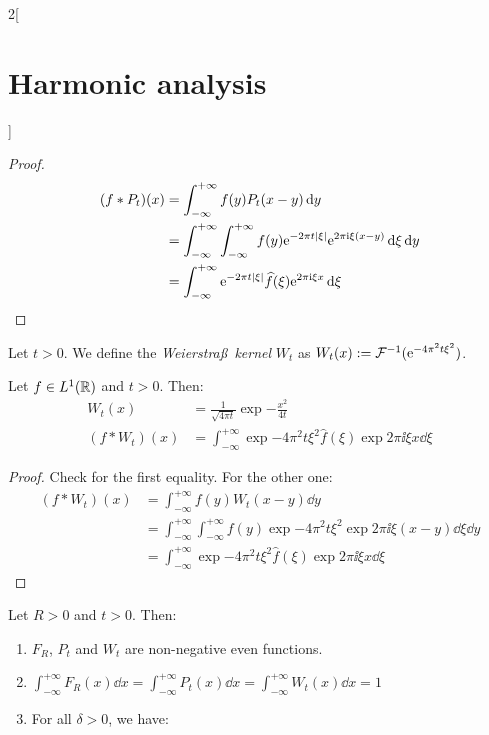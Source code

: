\documentclass[../../../main_math.tex]{subfiles}
\begin{document}
\begin{multicols}{2}[\section{Harmonic analysis}]
\begin{proof}
\begin{align*}
      (f*P_t)(x) & =\int_{-\infty}^{+\infty}f(y)P_t(x-y)\dd{y}                                                                      \\
                 & =\int_{-\infty}^{+\infty}\int_{-\infty}^{+\infty}f(y)\mathrm{e}^{-2\pi t\abs{\xi}}\mathrm{e}^{2\pi\mathrm{i} \xi (x-y)}\dd{\xi}\dd{y} \\
                 & =\int_{-\infty}^{+\infty}\mathrm{e}^{-2\pi t\abs{\xi}}\widehat{f}(\xi)\mathrm{e}^{2\pi\mathrm{i}\xi x}\dd{\xi}
    \end{align*}
  \end{proof}
  \begin{definition}
    Let $t>0$. We define the \emph{Weierstra\ss\ kernel} $W_t$ as $W_t(x):=\mathcal{F}^{-1}(\mathrm{e}^{-4\pi^2 t\xi^2})$.
  \end{definition}
  \begin{lemma}\label{HA:weierstrassKernel2}
    Let $f\in L^1(\mathbb{R})$ and $t>0$. Then:
    \begin{align*}
      W_t(x)     & =\frac{1}{\sqrt{4\pi t}}\exp{-\frac{x^2}{4t}}                                           \\
      (f*W_t)(x) & =\int_{-\infty}^{+\infty}\exp{-4\pi^2 t\xi^2}\widehat{f}(\xi)\exp{2\pi\ii\xi x}\dd{\xi}
    \end{align*}
  \end{lemma}
  \begin{proof}
    Check  for the first equality. For the other one:
    \begin{align*}
      (f*W_t)(x) & =\int_{-\infty}^{+\infty}f(y)W_t(x-y)\dd{y}                                                                    \\
                 & =\int_{-\infty}^{+\infty}\int_{-\infty}^{+\infty}f(y)\exp{-4\pi^2 t\xi^2}\exp{2\pi\ii \xi (x-y)}\dd{\xi}\dd{y} \\
                 & =\int_{-\infty}^{+\infty}\exp{-4\pi^2 t\xi^2}\widehat{f}(\xi)\exp{2\pi\ii\xi x}\dd{\xi}
    \end{align*}
  \end{proof}
  \begin{proposition}
    Let $R>0$ and $t>0$. Then:
    \begin{enumerate}
      \item $F_R$, $P_t$ and $W_t$ are non-negative even functions.
      \item $\int_{-\infty}^{+\infty}F_R(x)\dd{x}=\int_{-\infty}^{+\infty}P_t(x)\dd{x}=\int_{-\infty}^{+\infty}W_t(x)\dd{x}=1$
      \item For all $\delta>0$, we have:

\end{enumerate}
\end{proposition}
\end{multicols}
\end{document}
